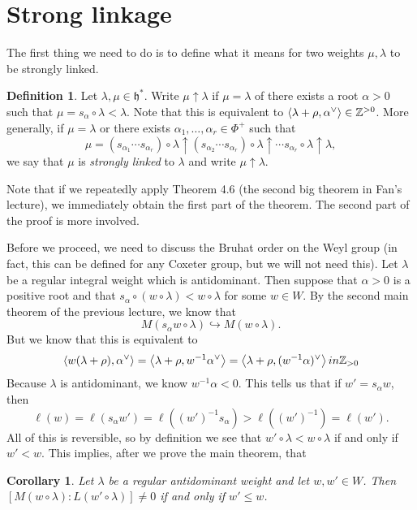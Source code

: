 \documentclass{amsart}
\newtheorem{cor}[thm]{Corollary}
\theoremstyle{definition}
\newtheorem{defn}[thm]{Definition}
\theoremstyle{remark}
\theoremstyle{plain}
\theoremstyle{definition}
\theoremstyle{remark}
\newcommand{\Z}{\mathbb{Z}}
\newcommand{\h}{\mathfrak{h}}
\newcommand{\1}{\mathbf{1}}
\newcommand{\2}{\mathbf{2}}
\newcommand{\3}{\mathbf{3}}
\begin{document}
\section{Strong linkage}
\label{sec:strong_linkage}

The first thing we need to do is to define what it means for two weights $\mu, \lambda$ to be strongly linked.

\begin{defn}
  Let $\lambda, \mu \in \h^{*}$. Write $\mu \uparrow \lambda$ if $\mu = \lambda$ of there exists a root $\alpha > 0$ such that $\mu = s_{\alpha} \circ \lambda < \lambda$. Note that this is equivalent to $\ev{\lambda + \rho, \alpha^{\vee}} \in \Z^{>0}$. More generally, if $\mu = \lambda$ or there exists $\alpha_{1}, \ldots, \alpha_{r} \in \Phi^{+}$ such that
  \[ \mu = (s_{\alpha_{1}} \cdots s_{\alpha_{r}}) \circ \lambda \uparrow (s_{\alpha_{2}} \cdots s_{\alpha_{r}}) \circ \lambda \uparrow \cdots s_{\alpha_{r}} \circ \lambda \uparrow \lambda, \]
  we say that $\mu$ is \textit{strongly linked} to $\lambda$ and write $\mu \uparrow \lambda$.
\end{defn}

Note that if we repeatedly apply Theorem 4.6 (the second big theorem in Fan's lecture), we immediately obtain the first part of the theorem. The second part of the proof is more involved.

Before we proceed, we need to discuss the Bruhat order on the Weyl group (in fact, this can be defined for any Coxeter group, but we will not need this). Let $\lambda$ be a regular integral weight which is antidominant. Then suppose that $\alpha > 0$ is a positive root and that $s_{\alpha} \circ (w \circ \lambda) < w \circ \lambda$ for some $w \in W$. By the second main theorem of the previous lecture, we know that
\[ M(s_{\alpha} w \circ \lambda) \hookrightarrow M(w \circ \lambda). \]
But we know that this is equivalent to
\[ \ev{w(\lambda + \rho), \alpha^{\vee}} = \ev{\lambda + \rho, w^{-1} \alpha^{\vee}} = \ev{\lambda + \rho, (w^{-1}\alpha)^{\vee}} in \Z_{>0} \]
Because $\lambda$ is antidominant, we know $w^{-1} \alpha < 0$. This tells us that if $w' = s_{\alpha} w$, then
\[ \ell(w) = \ell(s_{\alpha} w') = \ell((w')^{-1}s_{\alpha}) > \ell((w')^{-1}) = \ell(w'). \]
All of this is reversible, so by definition we see that $w' \circ \lambda < w \circ \lambda$ if and only if $w' < w$. This implies, after we prove the main theorem, that

\begin{cor}
  Let $\lambda$ be a regular antidominant weight and let $w, w' \in W$. Then $[M(w \circ \lambda) : L(w' \circ \lambda)] \neq 0$ if and only if $w' \leq w$.
\end{cor}
\end{document}
